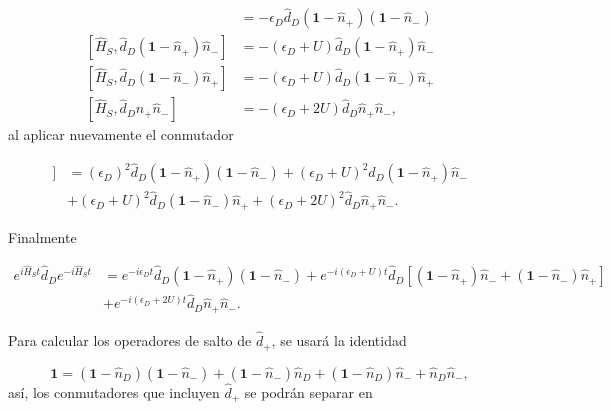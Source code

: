 \begin{appendixs}
\begin{align*}
    [\hat{H}_{S},\hat{d}_{D}(\textbf{1}-\hat{n}_{+})(\textbf{1} - \hat{n}_{-})] & = - \epsilon_{D}\hat{d}_{D}(\textbf{1}-\hat{n}_{+})(\textbf{1} - \hat{n}_{-}) \\
    [\hat{H}_{S},\hat{d}_{D}(\textbf{1}-\hat{n}_{+})\hat{n}_{-}] & = - (\epsilon_{D} + U)\hat{d}_{D}(\textbf{1} - \hat{n}_{+})\hat{n}_{-} \\
    [\hat{H}_{S},\hat{d}_{D}(\textbf{1}-\hat{n}_{-})\hat{n}_{+}] & = - (\epsilon_{D} + U)\hat{d}_{D}(\textbf{1} - \hat{n}_{-})\hat{n}_{+} \\
    [\hat{H}_{S},\hat{d}_{D}\hat{n}_{+}\hat{n}_{-}] & = - (\epsilon_{D} + 2U)\hat{d}_{D}\hat{n}_{+}\hat{n}_{-}, 
\end{align*}
al aplicar nuevamente el conmutador

\begin{align*}
    [\hat{H}_{S},[\hat{H}_{S},\hat{d}_{D}]] & = (\epsilon_{D})^{2}\hat{d}_{D}(\textbf{1} - \hat{n}_{+}) (\textbf{1} - \hat{n}_{-}) + (\epsilon_{D} + U)^{2}\hat{d}_{D}(\textbf{1} - \hat{n}_{+})\hat{n}_{-} \\
        & + (\epsilon_{D}+U)^{2}\hat{d}_{D}(\textbf{1} - \hat{n}_{-})\hat{n}_{+} + (\epsilon_{D} + 2U)^{2}\hat{d}_{D}\hat{n}_{+}\hat{n}_{-}.
\end{align*}

Finalmente 

\begin{align*}
    e^{i \hat{H}_{S}t}\hat{d}_{D}e^{-i\hat{H}_{S}t}  & = e^{-i\epsilon_{D}t} \hat{d}_{D}(\textbf{1} - \hat{n}_{+}) (\textbf{1} - \hat{n}_{-}) +  e^{-i(\epsilon_{D}+U)t} \hat{d}_{D}[(\textbf{1} - \hat{n}_{+})\hat{n}_{-} + (\textbf{1} - \hat{n}_{-})\hat{n}_{+}] \\
    & + e^{-i(\epsilon_{D} + 2U)t}\hat{d}_{D} \hat{n}_{+}\hat{n}_{-}.
\end{align*}

Para calcular los operadores de salto de $\hat{d}_{+}$, se usará la identidad 

\begin{equation*}
    \textbf{1} = (\textbf{1}-\hat{n}_{D})(\textbf{1}-\hat{n}_{-}) + (\textbf{1}-\hat{n}_{-})\hat{n}_{D} + (\textbf{1}-\hat{n}_{D})\hat{n}_{-} + \hat{n}_{D}\hat{n}_{-},
\end{equation*}
así, los conmutadores que incluyen $\hat{d}_{+}$ se podrán separar en 


\end{appendixs}
